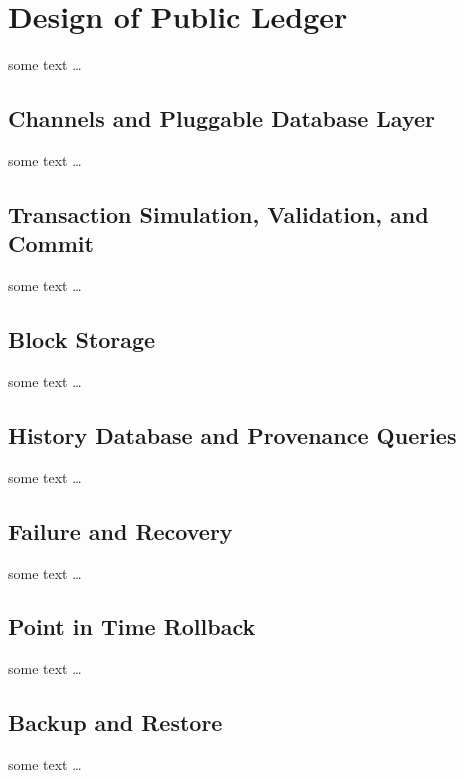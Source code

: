 \section{Design of Public Ledger}
some text \ldots

\subsection{Channels and Pluggable Database Layer}
some text \ldots

\subsection{Transaction Simulation, Validation, and Commit}
some text \ldots

\subsection{Block Storage}
some text \ldots

\subsection{History Database and Provenance Queries}
some text \ldots

\subsection{Failure and Recovery}
some text \ldots

\subsection{Point in Time Rollback}
some text \ldots

\subsection{Backup and Restore}
some text \ldots
